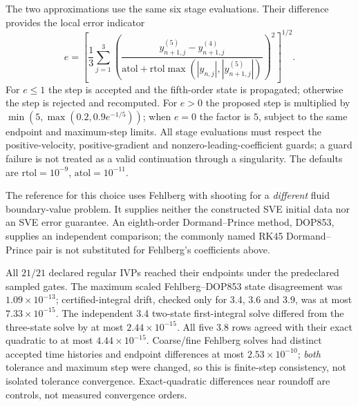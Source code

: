 \documentclass[11pt]{article}
\theoremstyle{definition}
\begin{document}
The two approximations use the same six stage evaluations. Their difference
provides the local error indicator
\begin{equation}
 e=\left[\frac13\sum_{j=1}^3
 \left(\frac{y_{n+1,j}^{(5)}-y_{n+1,j}^{(4)}}
 {\mathrm{atol}+\mathrm{rtol}\max(|y_{n,j}|,|y_{n+1,j}^{(5)}|)}\right)^2
 \right]^{1/2}.
 \label{eq:sve-rkf-error}
\end{equation}
For $e\leq1$ the step is accepted and the fifth-order state is propagated;
otherwise the step is rejected and recomputed. For $e>0$ the proposed step
is multiplied by $\min(5,\max(0.2,0.9e^{-1/5}))$; when $e=0$ the
factor is $5$, subject to the same endpoint and maximum-step limits.
All stage evaluations must respect the positive-velocity, positive-gradient
and nonzero-leading-coefficient guards; a guard failure is not treated as
a valid continuation through a singularity. The defaults are
$\mathrm{rtol}=10^{-9}$, $\mathrm{atol}=10^{-11}$.

The reference for this choice uses Fehlberg with shooting for a
\emph{different} fluid boundary-value problem. It supplies neither the
constructed SVE initial data nor an SVE error guarantee. An eighth-order
Dormand--Prince method, DOP853, supplies an independent comparison;
the commonly named RK45 Dormand--Prince pair is not substituted for
Fehlberg's coefficients above.

All $21/21$ declared regular IVPs reached their endpoints under the
predeclared sampled gates. The maximum scaled Fehlberg--DOP853 state
disagreement was $1.09\times10^{-13}$; certified-integral drift, checked
only for 3.4, 3.6 and 3.9, was at most $7.33\times10^{-15}$.
The independent 3.4 two-state first-integral solve differed from the
three-state solve by at most $2.44\times10^{-15}$.
All five 3.8 rows agreed with their exact quadratic to at most
$4.44\times10^{-15}$. Coarse/fine Fehlberg solves had distinct accepted
time histories and endpoint differences at most $2.53\times10^{-10}$;
\emph{both} tolerance and maximum step were changed, so this is finite-step
consistency, not isolated tolerance convergence. Exact-quadratic differences
near roundoff are controls, not measured convergence orders.
\end{document}
